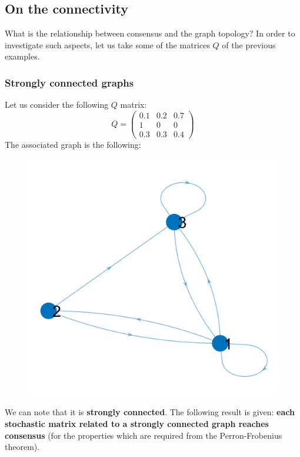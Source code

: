 \subsection{On the connectivity}
What is the relationship between consensus and the graph topology? In order to investigate such aspects, let us take some of the matrices $Q$ of the previous examples.

{\color{blue}\subsubsection{Strongly connected graphs}}
Let us consider the following $Q$ matrix:
\begin{equation*}
    Q=\begin{pmatrix}
        0.1&0.2&0.7\\1&0&0\\0.3&0.3&0.4
    \end{pmatrix}
\end{equation*}
The associated graph is the following: 
\begin{figure}[h]
    \centering
    \includegraphics[scale=0.6]{images/Es1_gr.png}
\end{figure}
\noindent
We can note that it is \textbf{strongly connected}. The following result is given:
\textbf{each stochastic matrix related to a strongly connected graph reaches consensus} (for the properties which are required from the Perron-Frobenius theorem).

